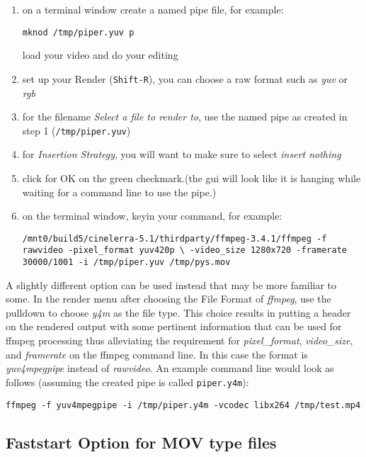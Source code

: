 \begin{enumerate}
    \item on a terminal window create a named pipe file, for example:
    \begin{lstlisting}[style=sh]
mknod /tmp/piper.yuv p
    \end{lstlisting}
    load your video and do your editing
    \item set up your Render (\texttt{Shift-R}), you can choose a raw format such as \textit{yuv} or \textit{rgb}
    \item for the filename \textit{Select a file to render to}, use the named pipe as created in step 1 (\texttt{/tmp/piper.yuv})
    \item for \textit{Insertion Strategy}, you will want to make sure to select \textit{insert nothing}
    \item click for OK on the green checkmark.(the \CGG{} gui will look like it is hanging while waiting for a command line to use the pipe.)
    \item on the terminal window, keyin your command, for example:
    \begin{lstlisting}[style=sh]
/mnt0/build5/cinelerra-5.1/thirdparty/ffmpeg-3.4.1/ffmpeg -f rawvideo -pixel_format yuv420p \ -video_size 1280x720 -framerate 30000/1001 -i /tmp/piper.yuv /tmp/pys.mov
    \end{lstlisting}
\end{enumerate}

A slightly different option can be used instead that may be more familiar to some.  In the render menu after choosing the File Format of \textit{ffmpeg}, use the pulldown to choose \textit{y4m} as the file type.  This choice results in putting a header on the rendered output with some pertinent information that can be used for ffmpeg processing thus alleviating the requirement for \textit{pixel\_format}, \textit{video\_size}, and \textit{framerate} on the ffmpeg command line.  In this case the format is \textit{yuv4mpegpipe} instead of \textit{rawvideo}.  An example command line would look as follows (assuming the created pipe is called \texttt{piper.y4m}):
\begin{lstlisting}[style=sh]
ffmpeg -f yuv4mpegpipe -i /tmp/piper.y4m -vcodec libx264 /tmp/test.mp4
\end{lstlisting}

\subsection{Faststart Option for MOV type files}%
\label{sub:faststart_option_mov0}

